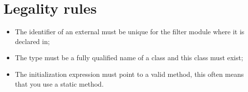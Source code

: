 \section*{Legality rules}
\begin{itemize}[noitemsep]
\item The identifier of an external must be unique for the filter module where it is declared in;
\item The type must be a fully qualified name of a class and this class must exist;
\item The initialization expression must point to a valid method, this often means that you use a static method.
\end{itemize}

\faq{}
\comments{}
\dotnetcomment{}
\pending{}

